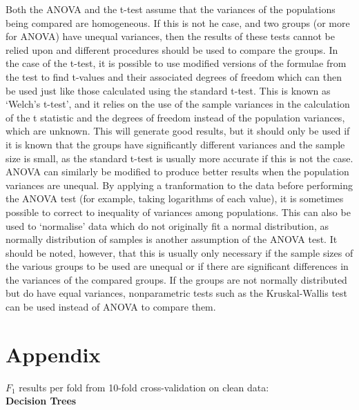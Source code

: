 \documentclass[a4paper]{article}
\begin{document}
Both the  ANOVA and the t-test assume that the variances of the populations being compared are homogeneous. If this is not he case, and two groups
(or more for ANOVA) have unequal variances, then the results of these tests cannot be relied upon and different procedures should be used
to compare the groups. In the case of the t-test, it is possible to use modified versions of the formulae from the test to find t-values
and their associated degrees of freedom which can then be used just like those calculated using the standard t-test.
This is known as `Welch's t-test', and it relies on the use of the sample variances in the calculation of the t statistic and the degrees of
freedom instead of the population variances, which are unknown. This will generate good results, but it should only be used if
it is known that the groups have significantly different variances and the sample size is small, as the standard t-test is usually more accurate
if this is not the case.
ANOVA can similarly be modified to produce better results when the population variances are unequal. By applying a tranformation to the data
before performing the ANOVA test (for example, taking logarithms of each value), it is sometimes possible to correct to inequality of variances
among populations. This can also be used to `normalise' data which do not originally fit a normal distribution, as normally distribution
of samples is another assumption of the ANOVA test. It should be noted, however, that this is usually only necessary if the sample sizes of the
various groups to be used are unequal or if there are significant differences in the variances of the compared groups. If the groups are not normally
distributed but do have equal variances, nonparametric tests such as the Kruskal-Wallis test can be used instead of ANOVA to compare them.
 
\newpage 
\section{Appendix}

$F_1$ results per fold from 10-fold cross-validation on clean data:\\

{\bf Decision Trees}\\
\end{document}
